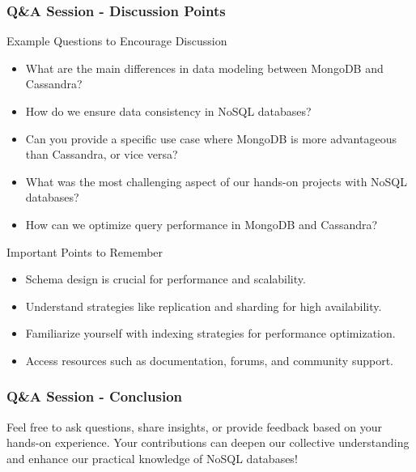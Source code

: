 \documentclass[aspectratio=169]{beamer}
\begin{document}
\begin{frame}[fragile]
    \frametitle{Q\&A Session - Discussion Points}
    \begin{block}{Example Questions to Encourage Discussion}
        \begin{itemize}
            \item What are the main differences in data modeling between MongoDB and Cassandra?
            \item How do we ensure data consistency in NoSQL databases?
            \item Can you provide a specific use case where MongoDB is more advantageous than Cassandra, or vice versa?
            \item What was the most challenging aspect of our hands-on projects with NoSQL databases?
            \item How can we optimize query performance in MongoDB and Cassandra?
        \end{itemize}
    \end{block}

    \begin{block}{Important Points to Remember}
        \begin{itemize}
            \item Schema design is crucial for performance and scalability.
            \item Understand strategies like replication and sharding for high availability.
            \item Familiarize yourself with indexing strategies for performance optimization.
            \item Access resources such as documentation, forums, and community support.
        \end{itemize}
    \end{block}
\end{frame}

\begin{frame}[fragile]
    \frametitle{Q\&A Session - Conclusion}
    Feel free to ask questions, share insights, or provide feedback based on your hands-on experience. Your contributions can deepen our collective understanding and enhance our practical knowledge of NoSQL databases!
\end{frame}
\end{document}
